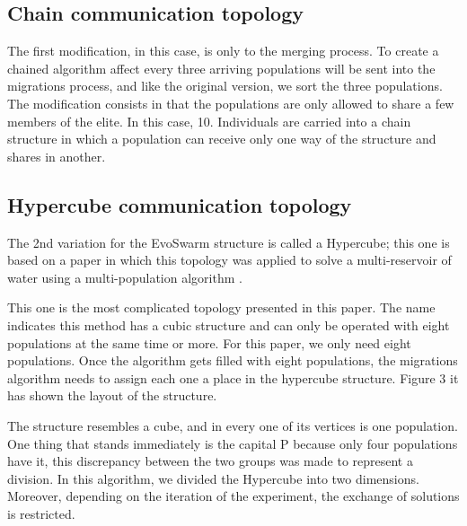 \documentclass[runningheads]{llncs}
\begin{document}
\subsection{Chain communication topology}

The first modification, in this case, is only to the merging process. To create
a chained algorithm affect every three arriving populations will be sent into
the migrations process, and like the original version, we sort the three
populations. The modification consists in that the populations are only allowed
to share a few members of the elite. In this case, 10. Individuals are carried
into a chain structure in which a population can receive only one way of the
structure and shares in another.


\subsection{Hypercube communication topology}

The 2nd variation for the EvoSwarm structure is called a Hypercube; this one is
based on a paper in which this topology was applied to solve a multi-reservoir
of water using a multi-population algorithm \cite{b20}.  

This one is the most complicated topology presented in this paper. The name
indicates this method has a cubic structure and can only be operated with eight
populations at the same time or more. For this paper, we only need eight
populations. Once the algorithm gets filled with eight populations, the
migrations algorithm needs to assign each one a place in the hypercube
structure. Figure 3 it has shown the layout of the structure.


The structure resembles a cube, and in every one of its vertices is
one population. One thing that stands immediately is the capital P
because only four populations have it, this discrepancy between the
two groups was made to represent a division. In this algorithm, we
divided the Hypercube into two dimensions. Moreover, depending on
the %
iteration of the experiment, the exchange of solutions is restricted.
\end{document}
